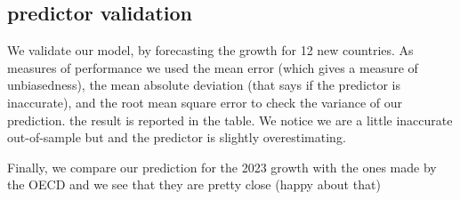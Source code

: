 \documentclass[11pt,a4paper]{article}
\begin{document}
\subsection{predictor validation}
We validate our model, by forecasting the growth for 12 new countries. As measures of performance we used the mean error (which gives a measure of unbiasedness), the mean absolute deviation (that says if the predictor is inaccurate), and the root mean square error to check the variance of our prediction. the result is reported in the table. We notice we  are a little inaccurate out-of-sample but and the predictor is slightly overestimating.

Finally, we compare our prediction for the 2023 growth with the ones made by the OECD and we see that they are pretty close (happy about that)
\end{document}
